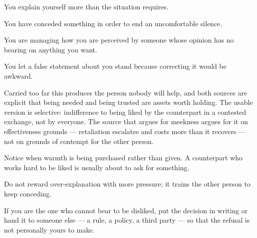 \begin{feedback}
  \item You explain yourself more than the situation requires.
  \item You have conceded something in order to end an uncomfortable silence.
  \item You are managing how you are perceived by someone whose opinion has no bearing on anything you want.
  \item You let a false statement about you stand because correcting it would be awkward.
\end{feedback}

\begin{failure}
Carried too far this produces the person nobody will help, and both sources are explicit that being needed and being trusted are assets worth holding. The usable version is selective: indifference to being liked by the counterpart in a contested exchange, not by everyone. The source that argues for meekness argues for it on effectiveness grounds --- retaliation escalates and costs more than it recovers --- not on grounds of contempt for the other person.
\end{failure}

\begin{countermeasures}
  \item Notice when warmth is being purchased rather than given. A counterpart who works hard to be liked is usually about to ask for something.
  \item Do not reward over-explanation with more pressure; it trains the other person to keep conceding.
  \item If you are the one who cannot bear to be disliked, put the decision in writing or hand it to someone else --- a rule, a policy, a third party --- so that the refusal is not personally yours to make.
\end{countermeasures}

\seesources
{}
